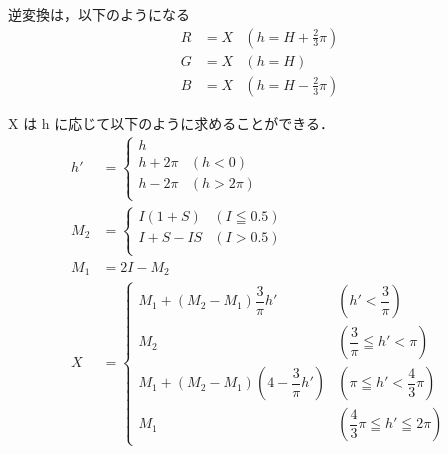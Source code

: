 \documentclass[
]{article}
\begin{document}
逆変換は，以下のようになる
\begin{equation}
\begin{aligned}
R &= X & (h = H + \frac{2}{3}\pi) \\
G &= X & (h = H) \\
B &= X & (h = H - \frac{2}{3}\pi)
\end{aligned}
\end{equation}


X は h に応じて以下のように求めることができる． 
\begin{equation}
\begin{aligned}
h' &=
\begin{cases}
    h \\
    h + 2 \pi & (h < 0) \\ 
    h - 2 \pi & (h > 2\pi) \\
\end{cases}
\\
M_2 &= 
\begin{cases}
    I(1 + S) & (I \leqq 0.5) \\
    I + S - IS & (I > 0.5) \\
\end{cases}
\\
M_1 &= 2I - M_2 \\
X &= 
\begin{cases}
M_1 + (M_2 - M_1) \dfrac{3}{\pi}h' & (h' < \dfrac{3}{\pi}) \\
M_2 & (\dfrac{3}{\pi} \leqq h' < \pi) \\
M_1 + (M_2 - M_1)(4 - \dfrac{3}{\pi}h') & (\pi \leqq h' < \dfrac{4}{3}\pi) \\
M_1 & (\dfrac{4}{3}\pi \leqq h' \leqq 2\pi)
\end{cases}
\end{aligned}
\end{equation}
\end{document}
